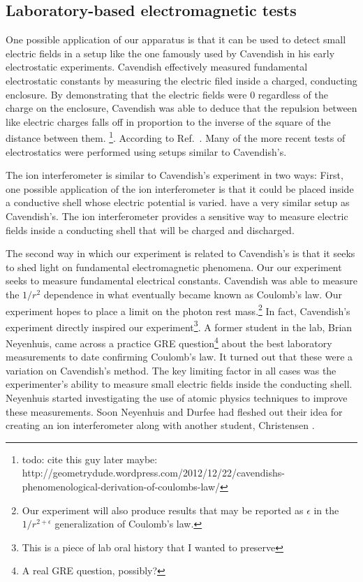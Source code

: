 \subsection{Laboratory-based electromagnetic tests}

One possible application of our apparatus is that it can be used  to detect small electric fields in a setup like the one famously used by Cavendish in his early electrostatic experiments. Cavendish effectively measured fundamental electrostatic constants by measuring the electric filed inside a charged, conducting enclosure. By demonstrating that the electric fields were 0 regardless of the charge on the enclosure, Cavendish was able to deduce that the repulsion between like electric charges falls off in proportion to the inverse of the square of the distance between them. \footnote{todo: cite this guy later maybe:  http://geometrydude.wordpress.com/2012/12/22/cavendishs-phenomenological-derivation-of-coulombs-law/}. 
According to Ref.\ \cite{jackson}. Many of the more recent tests of electrostatics were performed using setups similar to Cavendish's. 

The ion interferometer is similar to Cavendish's experiment in two ways: First, one possible application of the ion interferometer is that it could be placed inside a conductive shell whose electric potential is varied. have a very similar setup as Cavendish's. The ion interferometer provides a sensitive way to measure electric fields inside a conducting shell that will be charged and discharged. 

The second way in which our experiment is related to Cavendish's is that it seeks to shed light on fundamental electromagnetic phenomena. Our our experiment seeks to measure fundamental electrical constants. Cavendish was able to measure the $1/r^2$ dependence in what eventually became known as Coulomb's law. Our experiment hopes to place a limit on the photon rest mass.\footnote{Our experiment will also produce results that may be reported as $\epsilon$ in the $1/r^{2+\epsilon}$ generalization of Coulomb's law.}
In fact, Cavendish's experiment directly inspired our experiment\footnote{This is a piece of lab oral history that I wanted to preserve}. A former student in the lab, Brian Neyenhuis, came across a practice GRE question\footnote{A real GRE question, possibly?} about the best laboratory measurements to date confirming Coulomb's law. It turned out that these were a variation on Cavendish's method. The key limiting factor in all cases was the experimenter's ability to measure small electric fields inside the conducting shell. Neyenhuis started investigating the use of atomic physics techniques to improve these measurements. Soon Neyenhuis and Durfee had fleshed out their idea for creating an ion interferometer along with another student, Christensen \cite{NeyenhuisIon}\cite{christensen_arxiv_calcs}.  



